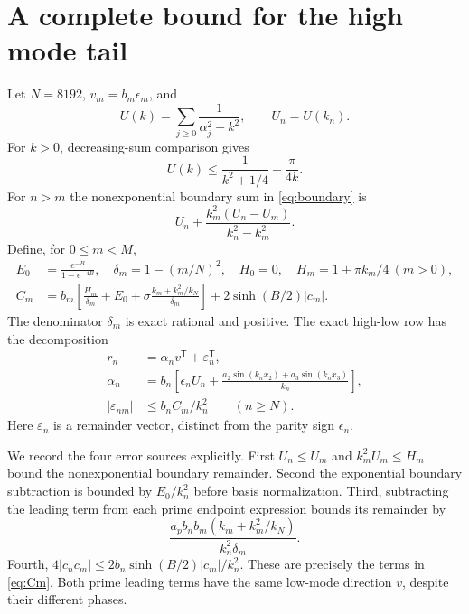\documentclass[11pt]{article}
\begin{document}
\section{A complete bound for the high mode tail}
Let $N=8192$, $v_m=b_m\epsilon_m$, and
\[
 U(k)=\sum_{j\ge0}\frac1{\alpha_j^2+k^2},\qquad U_n=U(k_n).
\]
For $k>0$, decreasing-sum comparison gives
\[
 U(k)\le\frac1{k^2+1/4}+\frac\pi{4k}.
\]
For $n>m$ the nonexponential boundary sum in \eqref{eq:boundary} is
\[
 U_n+\frac{k_m^2(U_n-U_m)}{k_n^2-k_m^2}.
\]
Define, for $0\le m<M$,
\begin{align}
 E_0&=\frac{e^{-B}}{1-e^{-4B}},\quad \delta_m=1-(m/N)^2,\quad
 H_0=0,\quad H_m=1+\pi k_m/4\ (m>0),\nonumber\\
 C_m&=b_m\left[\frac{H_m}{\delta_m}+E_0
       +\sigma\frac{k_m+k_m^2/k_N}{\delta_m}\right]
       +2\sinh(B/2)|c_m|.\label{eq:Cm}
\end{align}
The denominator $\delta_m$ is exact rational and positive. The exact high-low row has the decomposition
\begin{align}
 r_n&=\alpha_n v^{\mathsf T}+\varepsilon_n^{\mathsf T},\nonumber\\
 \alpha_n&=b_n\left[\epsilon_n U_n+
       \frac{a_2\sin(k_nx_2)+a_3\sin(k_nx_3)}{k_n}\right],\nonumber\\
 |\varepsilon_{nm}|&\le b_nC_m/k_n^2\qquad(n\ge N).\label{eq:rowtail}
\end{align}
Here $\varepsilon_n$ is a remainder vector, distinct from the parity sign $\epsilon_n$.

We record the four error sources explicitly. First $U_n\le U_m$ and $k_m^2U_m\le H_m$ bound the nonexponential boundary remainder. Second the exponential boundary subtraction is bounded by $E_0/k_n^2$ before basis normalization. Third, subtracting the leading term from each prime endpoint expression bounds its remainder by
\[
 \frac{a_pb_nb_m(k_m+k_m^2/k_N)}{k_n^2\delta_m}.
\]
Fourth, $4|c_nc_m|\le2b_n\sinh(B/2)|c_m|/k_n^2$. These are precisely the terms in \eqref{eq:Cm}. Both prime leading terms have the same low-mode direction $v$, despite their different phases.
\end{document}
